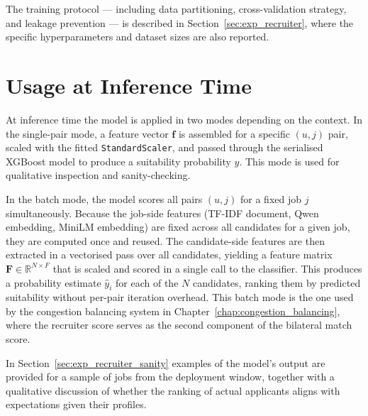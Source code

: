The training protocol --- including data partitioning, 
cross-validation strategy, and leakage prevention --- is described 
in Section~\ref{sec:exp_recruiter}, where the 
specific hyperparameters and dataset sizes are also reported.





\section{Usage at Inference Time}
\label{sec:recruiter_inference}
 
At inference time the model is applied in two modes depending on the context. In the single-pair mode, a feature vector $\mathbf{f}$ is assembled for a specific $(u,j)$ pair, scaled with the fitted \texttt{StandardScaler}, and passed through the serialised XGBoost model to produce a suitability probability $\hat{y}$. This mode is used for qualitative inspection and sanity-checking.
 
In the batch mode, the model scores all pairs $(u,j)$ for a fixed job $j$ simultaneously. Because the job-side features (TF-IDF document, Qwen embedding, MiniLM embedding) are fixed across all candidates for a given job, they are computed once and reused. The candidate-side features are then extracted in a vectorised pass over all candidates, yielding a feature matrix $\mathbf{F} \in \mathbb{R}^{N \times F}$ that is scaled and scored in a single call to the classifier. This produces a probability estimate $\hat{y}_i$ for each of the $N$ candidates, ranking them by predicted suitability without per-pair iteration overhead. This batch mode is the one used by the congestion balancing system in Chapter~\ref{chap:congestion_balancing}, where the recruiter score serves as the second component of the bilateral match score.
 
In Section~\ref{sec:exp_recruiter_sanity} examples of the model's output are provided for a sample of jobs from the deployment window, together with a qualitative discussion of whether the ranking of actual applicants aligns with expectations given their profiles.